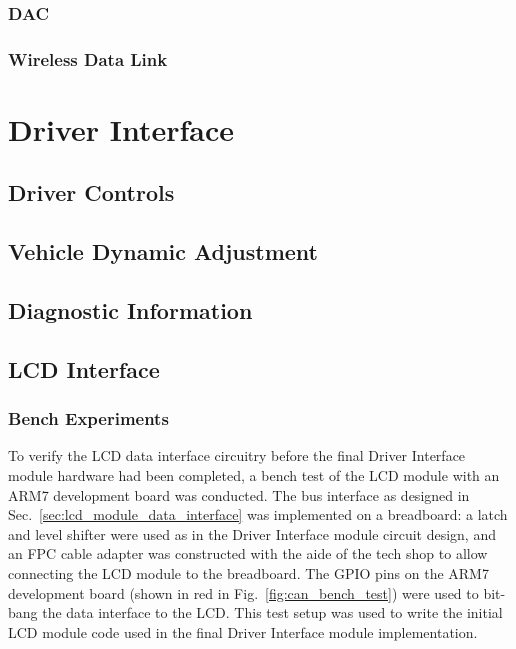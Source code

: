 \subsubsection{DAC }


\subsubsection{Wireless Data Link}


\section{Driver Interface}


\subsection{Driver Controls}


\subsection{Vehicle Dynamic Adjustment}


\subsection{Diagnostic Information}


\subsection{LCD Interface}

\subsubsection{Bench Experiments}

To verify the LCD data interface circuitry before the final Driver Interface module hardware had been completed, a bench test of the LCD module with an ARM7 development board was conducted. The bus interface as designed in Sec.\ \ref{sec:lcd_module_data_interface} was implemented on a breadboard: a latch and level shifter were used as in the Driver Interface module circuit design, and an FPC cable adapter was constructed with the aide of the tech shop to allow connecting the LCD module to the breadboard. The GPIO pins on the ARM7 development board (shown in red in Fig.\ \ref{fig:can_bench_test}) were used to bit-bang the data interface to the LCD. This test setup was used to write the initial LCD module code used in the final Driver Interface module implementation.

